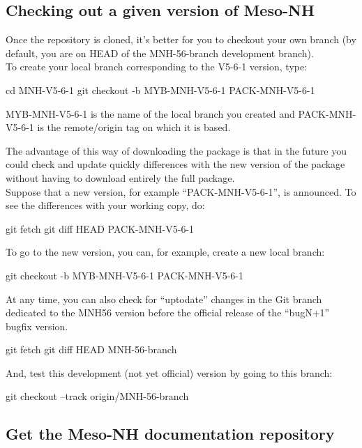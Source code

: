 \subsection{Checking out a given version of Meso-NH}

Once the repository is cloned, it's better for you to checkout your own branch (by default, you are on HEAD of the MNH-56-branch development branch). \\

To create your local branch corresponding to the V5-6-1 version, type:
\begin{bashcode}
cd MNH-V5-6-1
git checkout -b MYB-MNH-V5-6-1 PACK-MNH-V5-6-1
\end{bashcode}

MYB-MNH-V5-6-1 is the name of the local branch you created and PACK-MNH-V5-6-1 is the remote/origin tag on which it is based.

The advantage of this way of downloading the package is that in the future you could check and update quickly differences with the new version of the package without having to download entirely the full package. \\

Suppose that a new version, for example ``PACK-MNH-V5-6-1'', is announced. To see the differences with your working copy, do:
\begin{bashcode}
git fetch
git diff HEAD PACK-MNH-V5-6-1
\end{bashcode}

To go to the new version, you can, for example, create a new local branch:
\begin{bashcode}
git checkout -b MYB-MNH-V5-6-1 PACK-MNH-V5-6-1
\end{bashcode}

At any time, you can also check for ``uptodate'' changes in the Git branch dedicated to the MNH56 version before the official release of the ``bugN+1'' bugfix version.
\begin{bashcode}
git fetch
git diff HEAD MNH-56-branch
\end{bashcode}

And, test this development (not yet official) version by going to this branch:
\begin{bashcode}
git checkout --track origin/MNH-56-branch
\end{bashcode}

\subsection{Get the Meso-NH documentation repository}

